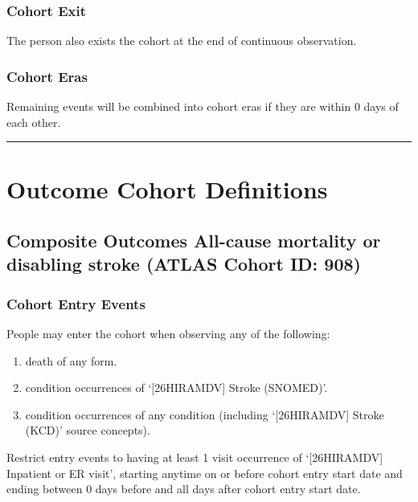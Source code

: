 \documentclass[
  12pt,
]{article}
\begin{document}
\subsubsection{Cohort Exit}\label{cohort-exit-7}

The person also exists the cohort at the end of continuous observation.

\subsubsection{Cohort Eras}\label{cohort-eras-7}

Remaining events will be combined into cohort eras if they are within 0
days of each other.

\begin{center}\rule{0.5\linewidth}{0.5pt}\end{center}

\section{Outcome Cohort Definitions}\label{outcome-cohort-definitions}

\subsection{Composite Outcomes All-cause mortality or disabling stroke
(ATLAS Cohort ID:
908)}\label{composite-outcomes-all-cause-mortality-or-disabling-stroke-atlas-cohort-id-908}

\subsubsection{Cohort Entry Events}\label{cohort-entry-events-8}

People may enter the cohort when observing any of the following:

\begin{enumerate}
\def\labelenumi{\arabic{enumi}.}
\item
  death of any form.
\item
  condition occurrences of `{[}26HIRAMDV{]} Stroke (SNOMED)'.
\item
  condition occurrences of any condition (including `{[}26HIRAMDV{]}
  Stroke (KCD)' source concepts).
\end{enumerate}

Restrict entry events to having at least 1 visit occurrence of
`{[}26HIRAMDV{]} Inpatient or ER visit', starting anytime on or before
cohort entry start date and ending between 0 days before and all days
after cohort entry start date.
\end{document}
